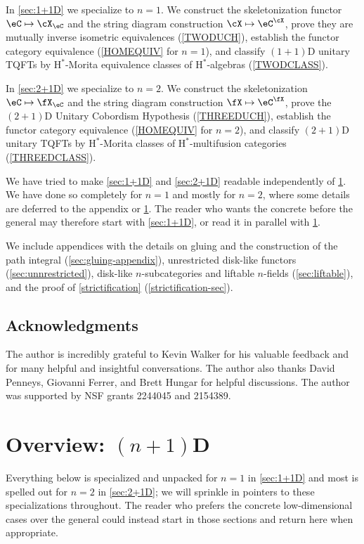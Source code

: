 \documentclass[12pt,reqno]{amsart}
\newcommand{\C}{\eC}
\newcommand{\Hstar}{\ensuremath{\mathrm{H}^{*}}}
\begin{document}
In \cref{sec:1+1D} we specialize to $n=1$. We construct the skeletonization functor $\eC\mapsto\cX_\eC$ and the string diagram construction $\cX\mapsto\eC^\cX$, prove they are mutually inverse isometric equivalences (\cref{TWODUCH}), establish the functor category equivalence (\cref{HOMEQUIV} for $n=1$), and classify $(1+1)$D unitary TQFTs by $\Hstar$-Morita equivalence classes of $\Hstar$-algebras (\cref{TWODCLASS}).
 
In \cref{sec:2+1D} we specialize to $n=2$. We construct the skeletonization $\C\mapsto\fX_\C$ and the string diagram construction $\fX\mapsto\C^\fX$, prove the $(2+1)$D Unitary Cobordism Hypothesis (\cref{THREEDUCH}), establish the functor category equivalence (\cref{HOMEQUIV} for $n=2$), and classify $(2+1)$D unitary TQFTs by $\Hstar$-Morita classes of $\Hstar$-multifusion categories (\cref{THREEDCLASS}).


We have tried to make \cref{sec:1+1D} and \cref{sec:2+1D} readable independently of \cref{sec:n+1D}. We have done so completely for $n=1$ and mostly for $n=2$, where some details are deferred to the appendix or \cref{sec:n+1D}. The reader who wants the concrete before the general may therefore start with \cref{sec:1+1D}, or read it in parallel with \cref{sec:n+1D}.

We include appendices with the details on gluing and the construction of the path integral (\cref{sec:gluing-appendix}), unrestricted disk-like functors (\cref{sec:unnrestricted}), disk-like $n$-subcategories and liftable $n$-fields (\cref{sec:liftable}), and the proof of \cref{strictification} (\cref{strictification-sec}).

\subsection*{Acknowledgments}
The author is incredibly grateful to Kevin Walker for his valuable feedback and for many helpful and insightful conversations. The author also thanks David Penneys, Giovanni Ferrer, and Brett Hungar for helpful discussions. The author was supported by NSF grants 2244045 and 2154389.

\section{Overview: \texorpdfstring{$(n+1)$}{(n+1)}D}

\label{sec:n+1D}

Everything below is specialized and unpacked for $n=1$ in \cref{sec:1+1D} and most is spelled out for $n=2$ in \cref{sec:2+1D}; we will sprinkle in pointers to these specializations throughout. The reader who prefers the concrete low-dimensional cases over the general could instead start in those sections and return here when appropriate.
\end{document}
